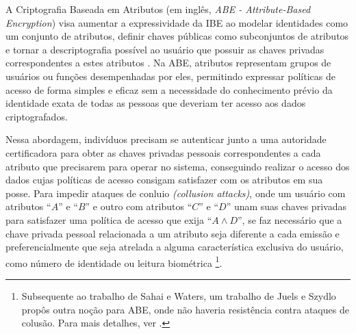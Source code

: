\documentclass[a4paper,11pt]{article}
\begin{document}

A Criptografia Baseada em Atributos (em inglês, \emph{ABE - Attribute-Based Encryption}) visa aumentar a expressividade da IBE ao modelar identidades como um conjunto de atributos, definir chaves públicas como subconjuntos de atributos e tornar a descriptografia possível ao usuário que possuir as chaves privadas correspondentes a estes atributos \cite{Sahai2005}.
Na ABE, atributos representam grupos de usuários ou funções desempenhadas por eles, permitindo expressar políticas de acesso de forma simples e eficaz sem a necessidade do conhecimento prévio da identidade exata de todas as pessoas que deveriam ter acesso aos dados criptografados.

Nessa abordagem, indivíduos precisam se autenticar junto a uma autoridade certificadora para obter as chaves privadas pessoais correspondentes a cada atributo que precisarem para operar no sistema, conseguindo realizar o acesso dos dados cujas políticas de acesso consigam satisfazer com os atributos em sua posse. Para impedir ataques de conluio \emph{(collusion attacks)}, onde um usuário com atributos ``$A$'' e ``$B$'' e outro com atributos ``$C$'' e ``$D$'' unam suas chaves privadas para satisfazer uma política de acesso que exija ``$A \wedge D$'', se faz necessário que a chave privada pessoal relacionada a um atributo seja diferente a cada emissão e preferencialmente que seja atrelada a alguma característica exclusiva do usuário, como número de identidade ou leitura biométrica \footnote{Subsequente ao trabalho de Sahai e Waters, um trabalho de Juels e Szydlo propôs outra noção para ABE, onde não haveria resistência contra ataques de colusão. Para mais detalhes, ver \cite{Juels2004}.}.
\end{document}
